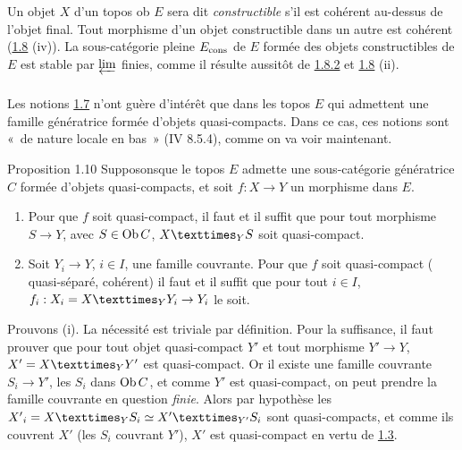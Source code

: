 \documentclass[10pt]{../fichiers-configuration-latex/smfart}
\begin{document}
\subsubsection{}
Un objet $X$ d'un  topos ob $E$ sera dit \emph{constructible} s'il est
cohérent au-dessus de l'objet final. Tout morphisme d'un objet
constructible dans un autre est cohérent (\hyperref[VI.prop1.8]{1.8} (iv)). La sous-catégorie
pleine $E_{\operatorname{cons}}$ de $E$ formée des objets constructibles de $E$ est
stable par $\varprojlim$ finies, comme il résulte aussitôt de \hyperref[VI.cor1.8.2]{1.8.2} et
\hyperref[VI.prop1.8]{1.8} (ii).

\subsubsection{}
Les notions \hyperref[VI.def1.7]{1.7} n'ont guère d'intérêt que dans
les topos $E$ qui
admettent une famille génératrice formée d'objets
quasi-compacts. Dans
ce cas, ces notions sont « de nature locale en bas » (IV 8.5.4),
comme on va voir maintenant.

\begin{enonce*}{Proposition 1.10}
Supposons\pageoriginale que le topos $E$ admette une sous-catégorie
génératrice $C$ formée d'objets quasi-compacts, et soit $f : X \to Y$ un morphisme
  dans $E$.
\begin{enumerate}
\renewcommand{\theenumi}{\roman{enumi}}
\renewcommand{\labelenumi}{(\theenumi)}
\item Pour que $f$ soit quasi-compact, il faut et il suffit que pour
  tout morphisme $S \to Y$, avec $S \in \operatorname{Ob} C$, $\fprod{X}{S}{Y}$ soit
  quasi-compact.

\item Soit $Y_i \to Y$, $i \in I$, une famille couvrante. Pour que $f$
  soit quasi-compact (\emph{\resp} quasi-séparé, \emph{\resp}
  cohérent) il faut et il suffit que pour tout $i \in I$, $f_i : X_i = \fprod{X}{Y_i}{Y}
  \to Y_i$ le soit.
\end{enumerate}
\end{enonce*}

Prouvons (i). La nécessité est triviale par définition.
Pour la suffisance, il faut prouver que pour tout objet quasi-compact
$Y'$ et tout morphisme $Y'\to Y$, $X'= \fprod{X}{Y'}{Y}$ est
quasi-compact. Or il existe une famille couvrante $S_i \to Y'$, les
$S_i$ dans $\operatorname{Ob} C$, et comme $Y'$ est quasi-compact, on peut prendre la
famille couvrante en question \emph{finie}. Alors par hypothèse les
${X'}_i = \fprod{X}{S_i}{Y} \simeq \fprod{X'}{S_i}{Y'}$ sont
quasi-compacts, et comme ils couvrent $X'$ (les $S_i$ couvrant $Y'$),
$X'$ est quasi-compact en vertu de \hyperref[VI.prop1.3]{1.3}.
\end{document}
